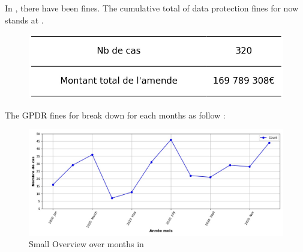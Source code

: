 \documentclass[12pt]{article}
\begin{document}
\newpage




	\begin{multicols}{2}
	
	In , there have been \textbf{} fines.
	The cumulative total of data protection fines for  now stands at \textbf{}.
	
	\begin{figure}[H]
	\centering\includegraphics[width=1\linewidth]{graphs/counter_year}
	\end{figure}


	The GPDR fines for  break down for each months as follow :

	\begin{figure}
	[H]\centering\includegraphics[width = 1.2\linewidth]{graphs/NbFinesPerMonth_year_graph}
	\caption{Small Overview over months in }
	\end{figure}

	\end{multicols}
\end{document}
